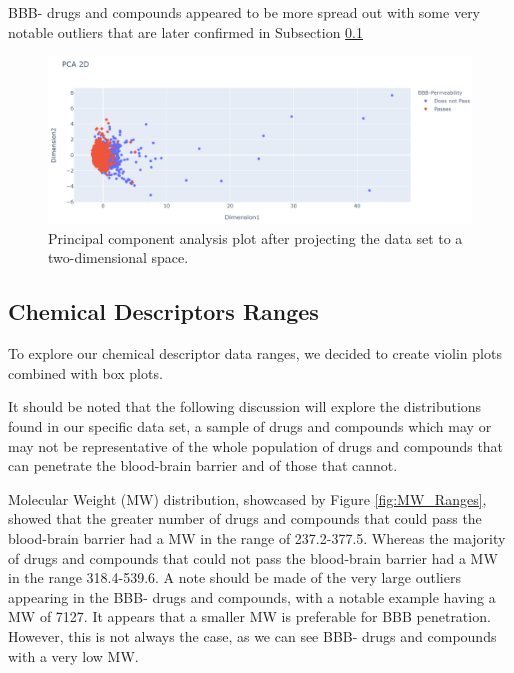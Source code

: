 BBB- drugs and compounds appeared to be more spread out with some very notable outliers that are later confirmed in Subsection \ref{subsec:CD_Ranges}


\begin{figure}[htb]
    \centering
    \includegraphics[width=1.0\linewidth]{images/PCA.pdf}    

    \caption{Principal component analysis plot after projecting the data set to a two-dimensional space.}

    \label{fig:PCA} 
\end{figure}


\subsection{Chemical Descriptors Ranges}
\label{subsec:CD_Ranges}

To explore our chemical descriptor data ranges, we decided to create violin plots combined with box plots.

It should be noted that the following discussion will explore the distributions found in our specific data set, a sample of drugs and compounds which may or may not be representative of the whole population of drugs and compounds that can penetrate the blood-brain barrier and of those that cannot.

Molecular Weight (MW) distribution, showcased by Figure \ref{fig:MW_Ranges}, showed that the greater number of drugs and compounds that could pass the blood-brain barrier had a MW in the range of 237.2-377.5. Whereas the majority of drugs and compounds that could not pass the blood-brain barrier had a MW in the range 318.4-539.6. A note should be made of the very large outliers appearing in the BBB- drugs and compounds, with a notable example having a MW of 7127. It appears that a smaller MW is preferable for BBB penetration. However, this is not always the case, as we can see BBB- drugs and compounds with a very low MW.

